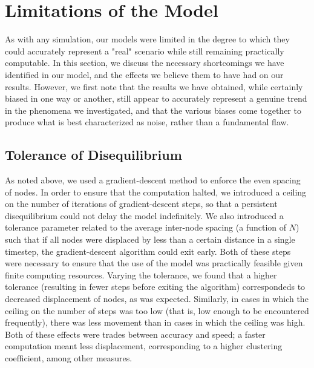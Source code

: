 \documentclass[aps,pre,reprint,superscriptaddress,amsmath,amssymb,nofootinbib]{revtex4-1}
\begin{document}
\section{Limitations of the Model}
As with any simulation, our models were limited in the degree to which they could accurately represent a "real" scenario while still remaining practically computable.  
In this section, we discuss the necessary shortcomings we have identified in our model, and the effects we believe them to have had on our results.  
However, we first note that the results we have obtained, while certainly biased in one way or another, still appear to accurately represent a genuine trend in the phenomena we investigated, and that the various biases come together to produce what is best characterized as noise, rather than a fundamental flaw.

\subsection{Tolerance of Disequilibrium}
As noted above, we used a gradient-descent method to enforce the even spacing of nodes.  
In order to ensure that the computation halted, we introduced a ceiling on the number of iterations of gradient-descent steps, so that a persistent disequilibrium could not delay the model indefinitely.  
We also introduced a tolerance parameter related to the average inter-node spacing (a function of $N$) such that if all nodes were displaced by less than a certain distance in a single timestep, the gradient-descent algorithm could exit early.  
Both of these steps were necessary to ensure that the use of the model was practically feasible given finite computing resources.
Varying the tolerance, we found that a higher tolerance (resulting in fewer steps before exiting the algorithm) correspondeds to decreased displacement of nodes, as was expected.  
Similarly, in cases in which the ceiling on the number of steps was too low (that is, low enough to be encountered frequently), there was less movement than in cases in which the ceiling was high.  
Both of these effects were trades between accuracy and speed; a faster computation meant less displacement, corresponding to a higher clustering coefficient, among other measures.
\end{document}
